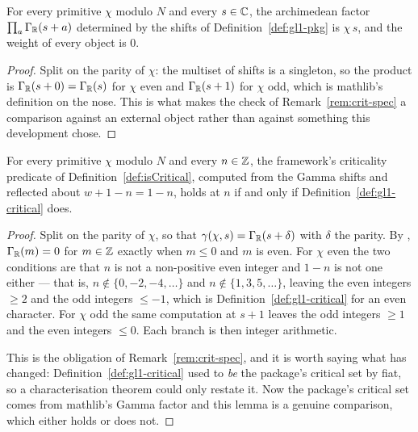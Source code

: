 \begin{lemma}
  \label{lem:gl1-gammaFactor-pkg}
  \leanok
  For every primitive $\chi$ modulo $N$ and every $s \in \mathbb{C}$, the archimedean factor
  $\prod_{a} \Gamma_{\mathbb{R}}(s+a)$ determined by the shifts of Definition~\ref{def:gl1-pkg} is
   $\chi\, s$, and the weight of every object is $0$.
\end{lemma}
\begin{proof}
  \leanok
  Split on the parity of $\chi$: the multiset of shifts is a singleton, so the product is
  $\Gamma_{\mathbb{R}}(s+0) = \Gamma_{\mathbb{R}}(s)$ for $\chi$ even and $\Gamma_{\mathbb{R}}(s+1)$ for $\chi$ odd,
  which is mathlib's definition on the nose. This is what makes the check of
  Remark~\ref{rem:crit-spec} a comparison against an external object rather than against
  something this development chose.
\end{proof}

\begin{lemma}
  \label{lem:gl1-crit-pkg}
  \leanok
  For every primitive $\chi$ modulo $N$ and every $n \in \mathbb{Z}$, the framework's criticality
  predicate of Definition~\ref{def:isCritical}, computed from the Gamma shifts and reflected
  about $w+1-n = 1-n$, holds at $n$ if and only if Definition~\ref{def:gl1-critical} does.
\end{lemma}
\begin{proof}
  \leanok
  Split on the parity of $\chi$, so that $\gamma(\chi,s) = \Gamma_{\mathbb{R}}(s+\delta)$ with $\delta$
  the parity. By , $\Gamma_{\mathbb{R}}(m) = 0$ for $m \in \mathbb{Z}$ exactly
  when $m \leq 0$ and $m$ is even. For $\chi$ even the two conditions are that $n$ is not a
  non-positive even integer and $1-n$ is not one either --- that is, $n \notin \{0,-2,-4,\dots\}$
  and $n \notin \{1,3,5,\dots\}$, leaving the even integers $\geq 2$ and the odd integers
  $\leq -1$, which is Definition~\ref{def:gl1-critical} for an even character. For $\chi$ odd the
  same computation at $s+1$ leaves the odd integers $\geq 1$ and the even integers $\leq 0$. Each
  branch is then integer arithmetic.

  This is the obligation of Remark~\ref{rem:crit-spec}, and it is worth saying what has changed:
  Definition~\ref{def:gl1-critical} used to \emph{be} the package's critical set by fiat, so a
  characterisation theorem could only restate it. Now the package's critical set comes from
  mathlib's Gamma factor and this lemma is a genuine comparison, which either holds or does not.
\end{proof}

